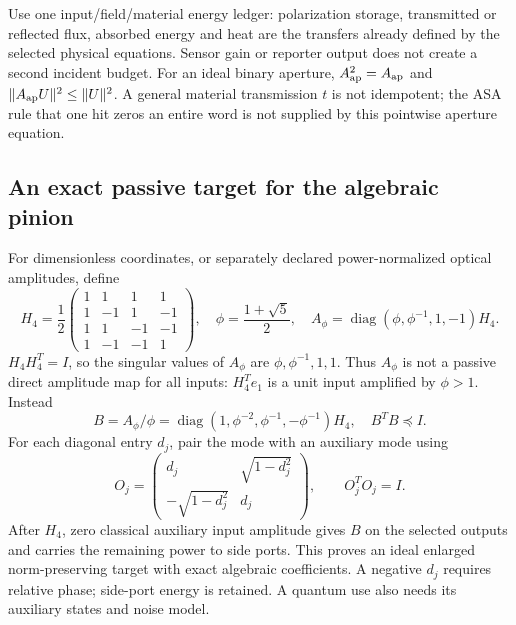 Use one input/field/material energy ledger: polarization storage, transmitted
or reflected flux, absorbed energy and heat are the transfers already defined
by the selected physical equations. Sensor gain or reporter output does not
create a second incident budget. For an ideal binary aperture,
$A_{\rm ap}^2=A_{\rm ap}$ and $\|A_{\rm ap}U\|^2\le\|U\|^2$.
A general material transmission $t$ is not idempotent; the ASA rule that one
hit zeros an entire word is not supplied by this pointwise aperture equation.

\subsection{An exact passive target for the algebraic pinion}
\label{sec:r14-passive-pinion}
For dimensionless coordinates, or separately declared power-normalized optical
amplitudes, define
\begin{equation}
 H_4=\frac12\begin{pmatrix}1&1&1&1\\1&-1&1&-1\\1&1&-1&-1\\1&-1&-1&1\end{pmatrix},
 \quad \phi=\frac{1+\sqrt5}{2},\quad
 A_\phi=\operatorname{diag}(\phi,\phi^{-1},1,-1)H_4.
 \label{eq:r14-pinion}
\end{equation}
$H_4H_4^T=I$, so the singular values of $A_\phi$ are
$\phi,\phi^{-1},1,1$. Thus $A_\phi$ is not a passive direct amplitude map for
all inputs: $H_4^Te_1$ is a unit input amplified by $\phi>1$. Instead
\begin{equation}
 B=A_\phi/\phi=\operatorname{diag}(1,\phi^{-2},\phi^{-1},-\phi^{-1})H_4,
 \quad B^TB\preceq I.
 \label{eq:r14-passive-map}
\end{equation}
For each diagonal entry $d_j$, pair the mode with an auxiliary mode using
\begin{equation}
 O_j=\begin{pmatrix}d_j&\sqrt{1-d_j^2}\\-\sqrt{1-d_j^2}&d_j\end{pmatrix},
 \qquad O_j^TO_j=I.
 \label{eq:r14-dilation}
\end{equation}
After $H_4$, zero classical auxiliary input amplitude gives $B$ on the selected
outputs and carries the remaining power to side ports. This proves an ideal
enlarged norm-preserving target with exact algebraic coefficients. A negative
$d_j$ requires relative phase; side-port energy is retained. A quantum use also
needs its auxiliary states and noise model.

